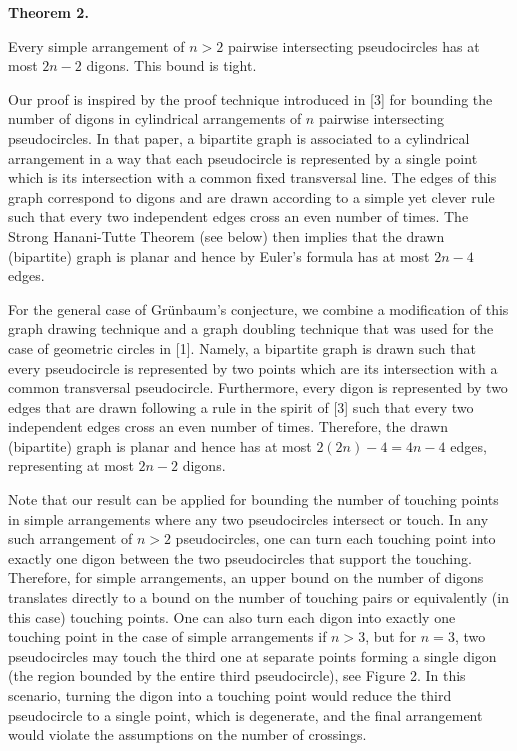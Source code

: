 \documentclass[10pt,a4paper]{amsart}
\begin{document}
\par\medskip\noindent\textbf{Theorem 2.}\par
Every simple arrangement of $n>2$ pairwise intersecting pseudocircles has at most $2n-2$ digons. This bound is tight.
\par
\par
\par

Our proof is inspired by the proof technique introduced in [3] for bounding the number of digons in cylindrical arrangements of $n$ pairwise intersecting pseudocircles. In that paper, a bipartite graph is associated to a cylindrical arrangement in a way that each pseudocircle is represented by a single point which is its intersection with a common fixed transversal line. The edges of this graph correspond to digons and are drawn according to a simple yet clever rule such that every two independent edges cross an even number of times. The Strong Hanani-Tutte Theorem (see below) then implies that the drawn (bipartite) graph is planar and hence by Euler’s formula has at most $2n-4$ edges.
\par
\par
For the general case of Grünbaum’s conjecture, we combine a modification of this graph drawing technique and a graph doubling technique that was used for the case of geometric circles in [1]. Namely, a bipartite graph is drawn such that every pseudocircle is represented by two points which are its intersection with a common transversal pseudocircle. Furthermore, every digon is represented by two edges that are drawn following a rule in the spirit of [3] such that every two independent edges cross an even number of times. Therefore, the drawn (bipartite) graph is planar and hence has at most $2(2n)-4=4n-4$ edges, representing at most $2n-2$ digons.
\par
\par
Note that our result can be applied for bounding the number of touching points in simple arrangements where any two pseudocircles intersect or touch. In any such arrangement of $n>2$ pseudocircles, one can turn each touching point into exactly one digon between the two pseudocircles that support the touching. Therefore, for simple arrangements, an upper bound on the number of digons translates directly to a bound on the number of touching pairs or equivalently (in this case) touching points. One can also turn each digon into exactly one touching point in the case of simple arrangements if $n>3$, but for $n=3$, two pseudocircles may touch the third one at separate points forming a single digon (the region bounded by the entire third pseudocircle), see Figure 2. In this scenario, turning the digon into a touching point would reduce the third pseudocircle to a single point, which is degenerate, and the final arrangement would violate the assumptions on the number of crossings.
\end{document}
